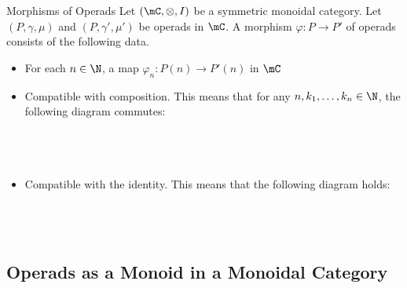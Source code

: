 \documentclass[a4paper]{article}
\begin{document}
\begin{defn}{Morphisms of Operads}{} Let $(\mC,\otimes,I)$ be a symmetric monoidal category. Let $(P,\gamma,\mu)$ and $(P,\gamma',\mu')$ be operads in $\mC$. A morphism $\varphi:P\to P'$ of operads consists of the following data. 
\begin{itemize}
\item For each $n\in\N$, a map $\varphi_n:P(n)\to P'(n)$ in $\mC$
\item Compatible with composition. This means that for any $n,k_1,\dots,k_n\in\N$, the following diagram commutes: \\~\\
\\~\\
\item Compatible with the identity. This means that the following diagram holds: \\~\\
\\~\\
\end{itemize}
\end{defn}

\subsection{Operads as a Monoid in a Monoidal Category}
\end{document}
